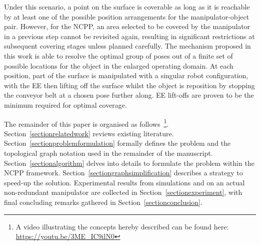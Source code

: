 \documentclass[letterpaper,journal]{IEEEtran}
\begin{document}
Under this scenario, a point on the surface is coverable as long as it is reachable by at least one of the possible position arrangements for the manipulator-object pair. However, for the NCPP, an area selected to be covered by the manipulator in a previous step cannot be revisited again, resulting in significant restrictions at subsequent covering stages unless planned carefully. The mechanism proposed in this work is able to resolve the optimal group of poses out of a finite set of possible locations for the object in the enlarged operating domain. At each position, part of the surface is manipulated with a singular robot configuration, with the EE then lifting off the surface whilst the object is reposition by stopping the conveyor belt at a chosen pose further along. 
EE lift-offs are proven to be the minimum required for optimal coverage. 

The remainder of this paper is organised as follows~\footnote{A video illustrating the concepts hereby described can be found here: \url{https://youtu.be/3ME_IC9ilN0}}.
Section~\ref{sectionrelatedwork} reviews existing literature. 
Section~\ref{sectionproblemformulation} formally defines the problem and the topological graph notation used in the remainder of the manuscript. 
Section~\ref{sectionalgorithm} delves into details to formulate the problem within the NCPP framework. 
Section~\ref{sectiongraphsimplification} describes a strategy to speed-up the solution. Experimental results from simulations and on an actual non-redundant manipulator are collected in Section~\ref{sectionexperiment}, with final concluding remarks gathered in Section~\ref{sectionconclusion}. 
\end{document}
